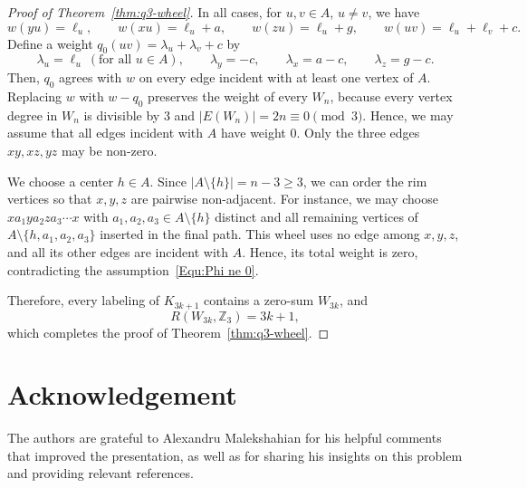 \documentclass[11pt]{article}
\theoremstyle{remark}
\newcommand{\Z}{\mathbb Z}
\begin{document}
\begin{proof}[Proof of Theorem~\ref{thm:q3-wheel}]
    In all cases, for $u,v\in A$, $u\ne v$, we have
    \begin{equation}\label{Equ:wheel structure}
        w(yu)=\ell_u,
        \qquad
        w(xu)=\ell_u+a,
        \qquad
        w(zu)=\ell_u+g,
        \qquad
        w(uv)=\ell_u+\ell_v+c.
    \end{equation}
    Define a weight $q_0(uv)=\lambda_u+\lambda_v+c$ by
    \[
        \lambda_u=\ell_u\ (\text{for all }u\in A),
        \qquad
        \lambda_y=-c,
        \qquad
        \lambda_x=a-c,
        \qquad
        \lambda_z=g-c.
    \]
    Then, $q_0$ agrees with $w$ on every edge incident with at least one vertex of $A$.  Replacing $w$ with $w-q_0$ preserves the weight of every $W_n$, because every vertex degree in $W_n$ is divisible by $3$ and $|E(W_n)|=2n\equiv0\pmod3$.
    Hence, we may assume that all edges incident with $A$ have weight $0$.
    Only the three edges $xy,xz,yz$ may be non-zero.

    We choose a center $h\in A$.
    Since $|A\setminus\{h\}|=n-3\ge3$, we can order the rim vertices so that $x,y,z$ are pairwise non-adjacent.
    For instance, we may choose $xa_1ya_2za_3\cdots x$
    with $a_1,a_2,a_3\in A\setminus\{h\}$ distinct and all remaining vertices of $A\setminus\{h,a_1,a_2,a_3\}$ inserted in the final path.
    This wheel uses no edge among $x,y,z$, and all its other edges are incident with $A$.
    Hence, its total weight is zero, contradicting the assumption~\eqref{Equ:Phi ne 0}.

    Therefore, every labeling of $K_{3k+1}$ contains a zero-sum $W_{3k}$, and
    \[
        R(W_{3k},\Z_3)=3k+1,
    \]
    which completes the proof of Theorem~\ref{thm:q3-wheel}.
\end{proof}



\section*{Acknowledgement}
The authors are grateful to Alexandru Malekshahian for his helpful comments that improved the presentation, as well as for sharing his insights on this problem and providing relevant references.
\end{document}
